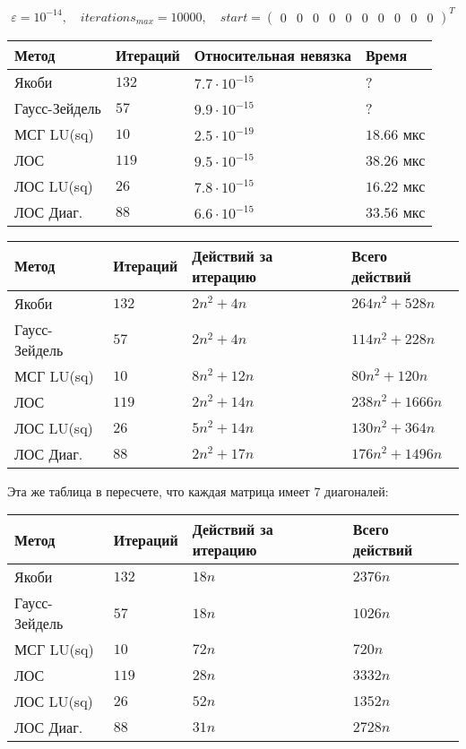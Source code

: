 $$ \varepsilon = 10^{-14}, \quad iterations_{max} = 10000, \quad start = \begin{pmatrix} 0 & 0 & 0 & 0 & 0 & 0 & 0 & 0 & 0 & 0 \end{pmatrix}^T $$

\setlength{\tabcolsep}{2pt}
\tabulinesep=0.3mm
\noindent\begin{tabu}{|X[-1,l]|X[-1,l]|X[-1,l]|X[-1,l]|}
\hline
Метод & Итераций & Относительная невязка & Время \\ \hline
Якоби & $132$ & $7.7\cdot 10^{-15}$ & ? \\ \hline
Гаусс-Зейдель & $57$ & $9.9 \cdot 10^{-15}$ & ? \\ \hline
МСГ LU(sq) & $10$ & $2.5 \cdot 10^{-19}$ & $18.66$ мкс \\ \hline
ЛОС & $119$ & $9.5 \cdot 10^{-15}$ & $38.26$ мкс \\ \hline
{}
ЛОС LU(sq) & $26$ & $7.8 \cdot 10^{-15}$ & $16.22$ мкс \\ \hline
ЛОС Диаг. & $88$ & $6.6 \cdot 10^{-15}$ & $33.56$ мкс \\ \hline
\end{tabu}

\vspace{5mm}

\setlength{\tabcolsep}{2pt}
\tabulinesep=0.3mm
\noindent\begin{tabu}{|X[-1,l]|X[-1,l]|X[-1,l]|X[-1,l]|}
\hline
Метод & Итераций & Действий за итерацию & Всего действий \\ \hline
Якоби & $132$ & $2n^2+4n$ & $264n^2+528n$ \\ \hline
Гаусс-Зейдель & $57$ & $2n^2+4n$ & $114n^2+228n$ \\ \hline
МСГ LU(sq) & $10$ & $8n^2+12n$ & $80n^2+120n$ \\ \hline
ЛОС & $119$ & $2n^2+14n$ & $238n^2+1666n$ \\ \hline
ЛОС LU(sq) & $26$ & $5n^2+14n$ & $130n^2+364n$ \\ \hline
ЛОС Диаг. & $88$ & $2n^2+17n$ & $176n^2+1496n$ \\ \hline
\end{tabu}

\vspace{5mm}

Эта же таблица в пересчете, что каждая матрица имеет 7 диагоналей:

\setlength{\tabcolsep}{2pt}
\tabulinesep=0.3mm
\noindent\begin{tabu}{|X[-1,l]|X[-1,l]|X[-1,l]|X[-1,l]|}
\hline
Метод & Итераций & Действий за итерацию & Всего действий \\ \hline
Якоби & $132$ & $18n$ & $2376n$ \\ \hline
Гаусс-Зейдель & $57$ & $18n$ & $1026n$ \\ \hline
МСГ LU(sq) & $10$ & $72n$ & $720n$ \\ \hline
ЛОС & $119$ & $28n$ & $3332n$ \\ \hline
ЛОС LU(sq) & $26$ & $52n$ & $1352n$ \\ \hline
ЛОС Диаг. & $88$ & $31n$ & $2728n$ \\ \hline
\end{tabu}

